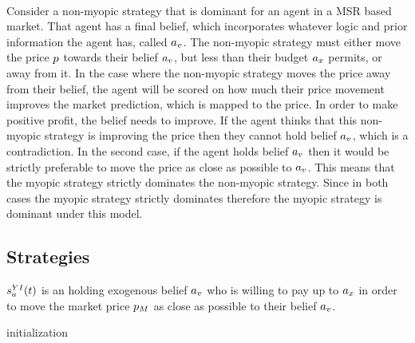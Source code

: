  \\
Consider a non-myopic strategy that is dominant for an agent in a MSR based market. That agent has a final belief, which incorporates whatever logic and prior information the agent has, called $a_v$. The non-myopic strategy must either move the price $p$ towards their belief $a_v$, but less than their budget $a_x$ permits, or away from it. In the case where the non-myopic strategy moves the price away from their belief, the agent will be scored on how much their price movement improves the market prediction, which is mapped to the price. In order to make positive profit, the belief needs to improve. If the agent thinks that this non-myopic strategy is improving the price then they cannot hold belief $a_v$, which is a contradiction. In the second case, if the agent holds belief $a_v$ then it would be strictly preferable to move the price as close as possible to $a_v$. This means that the myopic strategy strictly dominates the non-myopic strategy. Since in both cases the myopic strategy strictly dominates therefore the myopic strategy is dominant under this model.\\

\subsection{Strategies}
$s^{YI}_a(t)$ is an  holding exogenous belief $a_v$ who is willing to pay up to $a_x$ in order to move the market price $p_M$ as close as possible to their belief $a_v$. \\

\begin{algorithm}[H]
\SetAlgoLined
{}
initialization\;
\end{algorithm}

